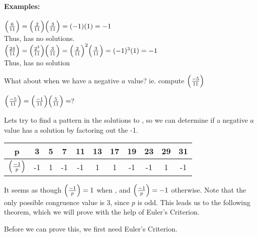 \documentclass[../main.tex]{subfiles}
\begin{document}
\paragraph{Examples:}
\begin{center}
    $\Big(\frac{6}{11}\Big)=\Big(\frac{2}{11}\Big)\Big(\frac{3}{11}\Big)=(-1)(1)=-1$ \\
    Thus,  has no solutions. \\
    $\Big(\frac{24}{11}\Big)=\Big(\frac{2^3}{11}\Big)\Big(\frac{3}{11}\Big)=\Big(\frac{2}{11}\Big)^2\Big(\frac{3}{11}\Big)=(-1)^3(1)=-1$ \\
    Thus,  has no solution
\end{center}
What about when we have a negative $a$ value? ie. compute $\Big(\frac{-5}{11}\Big)$
\begin{center}
    $\Big(\frac{-5}{11}\Big)=\Big(\frac{-1}{11}\Big)\Big(\frac{5}{11}\Big)=?$
\end{center}
Lets try to find a pattern in the solutions to , so we can determine if a negative $a$ value has a solution by factoring out the -1.
\begin{center}
    \begin{tabular}{ c|c c c c c c c c c c } 
        p & 3 & 5 & 7 & 11 & 13 & 17 & 19 & 23 & 29 & 31 \\
        \hline
        $\Big(\frac{-1}{p}\Big)$ & -1 & 1 & -1 & -1 & 1 & 1 & -1 & -1 & 1 & -1 \\ 
    \end{tabular}
\end{center}
It seems as though $\Big(\frac{-1}{p}\Big)=1$ when , and $\Big(\frac{-1}{p}\Big)=-1$ otherwise. Note that the only possible congruence value is 3, since $p$ is odd. This leads us to the following theorem, which we will prove with the help of Euler's Criterion.
Before we can prove this, we first need Euler's Criterion.
\end{document}
